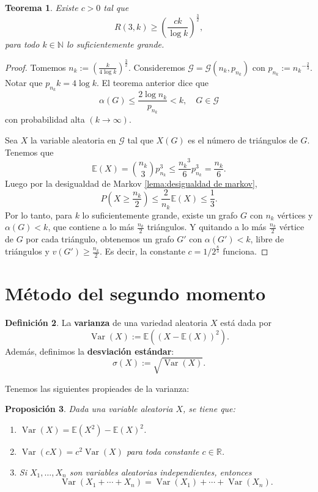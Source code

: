 \documentclass[12pt]{report}
\theoremstyle{plain}
\newtheorem{theorem}{Teorema}[section]
\newtheorem{proposition}[theorem]{Proposición}
\theoremstyle{definition}
\newtheorem{definition}[theorem]{Definición}
\newcommand{\naturals}{\mathbb{N}}
\newcommand{\reals}{\mathbb{R}}
\begin{document}
\begin{theorem}
Existe $c > 0$ tal que
\[
    R(3,k) \geq \left ( \frac{ck}{\log k} \right )^{\frac 3 2},
\]
para todo $k \in \naturals$ lo suficientemente grande.
\end{theorem}
\begin{proof}
Tomemos $n_k := \left ( \frac{k}{4 \log k} \right )^{\frac 3 2}$. Consideremos $\mathcal G = \mathcal G (n_k, p_{n_k})$ con $p_{n_k} := {n_k}^{-\frac 2 3}$. Notar que $p_{n_k}k = 4 \log k$. El teorema anterior dice que
\[
    \alpha (G) \leq \frac{2 \log {n_k}}{p_{n_k}} < k , \quad G\in \mathcal G
\]
con probabilidad alta $(k \to \infty)$.

Sea $X$ la variable aleatoria en $\mathcal G$ tal que $X(G)$ es el número de triángulos de $G$. Tenemos que
\[
    \mathbb{E} (X) = \binom {n_k} 3 p_{n_k}^3 \leq \frac{{n_k}^3}{6}p_{n_k}^3 = \frac {n_k} 6.
\]
Luego por la desigualdad de Markov \ref{lema:desigualdad de markov},
\[
    P(X \geq \frac {n_k} 2) \leq \frac{2}{{n_k}} \mathbb{E} (X) \leq \frac 1 3.
\]
Por lo tanto, para $k$ lo suficientemente grande, existe un grafo $G$ con $n_k$ vértices y $\alpha (G) < k$, que contiene a lo más $\frac {n_k} 2$ triángulos. Y quitando a lo más $\frac {n_k} 2$ vértice de $G$ por cada triángulo, obtenemos un grafo $G'$ con $\alpha (G') < k$, libre de triángulos y $v(G') \geq \frac {n_k} 2$. Es decir, la constante $c = 1/2^{\frac 8 3}$ funciona.
\end{proof}


\section{Método del segundo momento}

\begin{definition}
La \textbf{varianza} de una variedad aleatoria $X$ está dada por
\[
    \operatorname{Var} (X) := \mathbb{E} ((X - \mathbb{E}(X))^2).
\]
Además, definimos la \textbf{desviación estándar}:
\[
    \sigma (X) := \sqrt{\operatorname{Var}(X)}.
\]
\end{definition}

Tenemos las siguientes propieades de la varianza:
\begin{proposition}
Dada una variable aleatoria $X$, se tiene que:
\begin{enumerate}
\item $\operatorname{Var}(X) = \mathbb{E}(X^2)- \mathbb{E}(X)^2$.
\item $\operatorname{Var}(cX) = c^2 \operatorname{Var}(X)$ para toda constante $c \in \reals$.
\item Si $X_1, \ldots, X_n$ son variables aleatorias independientes, entonces
\[
    \operatorname{Var}(X_1 + \cdots + X_n) = \operatorname{Var}(X_1) + \cdots + \operatorname{Var}(X_n).
\]
\end{enumerate}
\end{proposition}
\end{document}
